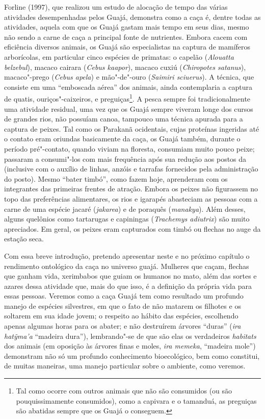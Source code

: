 Forline (1997), que realizou um estudo de alocação de tempo das várias
atividades desempenhadas pelos Guajá, demonstra como a caça é, dentre
todas as atividades, aquela com que os Guajá gastam mais tempo em seus
dias, mesmo não sendo a carne de caça a principal fonte de nutrientes.
Embora cacem com eficiência diversos animais, os Guajá são especialistas
na captura de mamíferos arborícolas, em particular cinco espécies de
primatas: o capelão (\emph{Alouatta belzebul}), macaco cairara
(\emph{Cebus kaapor}), macaco cuxiú (\emph{Chiropotes satanus}),
macaco"-prego (\emph{Cebus apela}) e mão"-de"-ouro (\emph{Saimiri
sciuerus}). A técnica, que consiste em uma ``emboscada aérea'' dos
animais, ainda contemplaria a captura de quatis, ouriços"-caixeiros, e
preguiças\footnote{Tal como ocorre com outros animais que não são
  consumidos (ou são pouquissimamente consumidos), como a capivara e o
  tamanduá, as preguiças são abatidas sempre que os Guajá o conseguem.}.
A pesca sempre foi tradicionalmente uma atividade residual, uma vez que
os Guajá sempre viveram longe dos cursos de grandes rios, não possuíam
canoa, tampouco uma técnica apurada para a captura de peixes. Tal como
os Parakanã ocidentais, cujas proteínas ingeridas até o contato eram
oriundas basicamente da caça, os Guajá também, durante o período
pré"-contato, quando viviam na floresta, consumiam muito pouco peixe;
passaram a consumi"-los com mais frequência após sua redução aos postos
da  (inclusive com o auxílio de linhas, anzóis e tarrafas
fornecidos pela administração do posto). Mesmo ``bater timbó'', como
fazem hoje, aprenderam com os integrantes das primeiras frentes de
atração. Embora os peixes não figurassem no topo das preferências
alimentares, os rios e igarapés abasteciam as pessoas com a carne de uma
espécie jacaré (\emph{jakarea}) e de poraquês (\emph{manakya}). Além
desses, alguns quelônios como tartarugas e capiningas (\emph{Trachemys
adiutrix}) são muito apreciados. Em geral, os peixes eram capturados com
timbó ou flechas no auge da estação seca.

Com essa breve introdução, pretendo apresentar neste e no próximo
capítulo o rendimento ontológico da caça no universo guajá. Mulheres que
caçam, flechas que ganham vida, xerimbabos que guiam os humanos no mato,
além das sortes e azares dessa atividade que, mais do que isso, é a
definição da própria vida para essas pessoas. Veremos como a caça Guajá
tem como resultado um profundo manejo de espécies silvestres, em que o
fato de não matarem os filhotes e os soltarem em sua idade jovem; o
respeito ao hábito das espécies, escolhendo apenas algumas horas para os
abater; e não destruírem árvores ``duras'' (\emph{ira hatỹma'a}
``madeira dura''), lembrando"-se de que são elas os verdadeiros
\emph{habitats} dos animais (em oposição às árvores finas e moles,
\emph{ira memeka}, ``madeira mole'') demonstram não só um profundo
conhecimento bioecológico, bem como constitui, de muitas maneiras, uma
manejo particular sobre o ambiente, como veremos.

